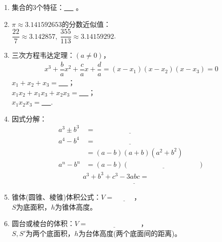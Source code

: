\documentclass{article}
\newif\ifte
\begin{document}
\begin{multicols}{2}
\begin{enumerate}[leftmargin=20pt]
\item 集合的3个特征：\underline{\ \ifte 
 确定性、互异性、无序性 \else \hspace{5cm} \fi\ } 。

\item $ \pi\approx 3.141592653 $的分数近似值：\\ $ \dfrac{22}{7} 
\approx 3.142857,\ \dfrac{355}{113}\approx 3.14159292 $. 

\item 三次方程韦达定理：$ (a\neq 0) $，
\begin{gather*}
    x^3+\dfrac{b}{a}x^2+\dfrac{c}{a}x+
    \dfrac{d}{a}=(x-x_1)(x-x_2)(x-x_3)=0
\end{gather*}
$ x_1+x_2+x_3= $\underline{\ \ifte $ -\dfrac{b}{a} $\else 
    \hspace{2cm} \fi\ }；\\
$ x_1x_2+x_1x_3+x_2x_3= $\underline{\ \ifte $ \dfrac{c}{a} $ 
    \else \hspace{2cm} \fi\ }；\\
$ x_1x_2x_3= $\underline{\ \ifte $ -\dfrac{d}{a} $ \else \hspace{2cm} \fi\ }.

\item 因式分解：
\begin{align*}
    a^3\pm b^3 &=\underline{\ \ifte (a\pm b)(a^2\mp ab+b^2)
        \else \hspace{4cm} \fi\ } \\
    a^4-b^4 &=\underline{\ \ifte (a-b)(a^3+a^2b+ab^2+b^3)
        \else \hspace{4cm} \fi\ } \\
          &=(a-b)(a+b)(a^2+b^2) \\
    a^n-b^n &=(a-b)(\underline{\ \ifte 
        a^{n-1}+a^{n-2}b+\cdots+b^{n-1}
        \else \hspace{4cm} \fi\ })
\end{align*}
\begin{align*}
   & a^3+b^3+c^3-3abc=\\ & \underline{\ \ifte 
    (a+b+c)(a^2+b^2+c^2-ab-bc-ca) \else \hspace{6cm} \fi\ } 
\end{align*}

\item 锥体(圆锥、棱锥)体积公式：$ V=\underline{\ \ifte 
    \dfrac{1}{3}Sh\else \hspace{1cm} \fi\ } $，\\
$ S $为底面积，$ h $为锥体高度。

\item 圆台或棱台的体积：$ V=\underline{\ \ifte 
\dfrac{1}{3}(S+\sqrt{SS'}+S')h\else \hspace{3cm} \fi\ } $，\\
$ S,S' $为两个底面积，$ h $为台体高度(两个底面间的距离)。




\end{enumerate}
\end{multicols}   
\end{document}
